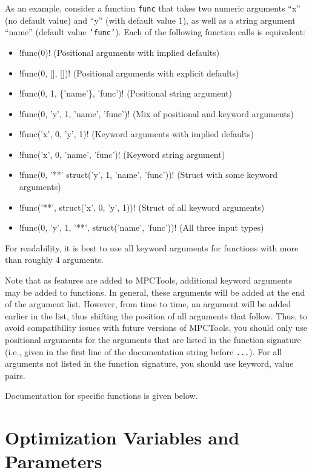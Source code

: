 \documentclass{article}
\newcommand{\mpctools}{MPCTools}
\providecommand{\lstinline}{}
\begin{document}
As an example, consider a function \texttt{func} that takes two numeric arguments ``x'' (no default value) and ``y'' (with default value 1), as well as a string argument ``name'' (default value \texttt{'func'}).
Each of the following function calls is equivalent:
%
\begin{itemize}
    \item \lstinline!func(0)! (Positional arguments with implied defaults)
    \item \lstinline!func(0, [], [])! (Positional arguments with explicit defaults)
    \item \lstinline!func(0, 1, \{'name'\}, 'func')! (Positional string argument)
    \item \lstinline!func(0, 'y', 1, 'name', 'func')! (Mix of positional and keyword arguments)
    \item \lstinline!func('x', 0, 'y', 1)! (Keyword arguments with implied defaults)
    \item \lstinline!func('x', 0, 'name', 'func')! (Keyword string argument)
    \item \lstinline!func(0, '**' struct('y', 1, 'name', 'func'))! (Struct with some keyword arguments)
    \item \lstinline!func('**', struct('x', 0, 'y', 1))! (Struct of all keyword arguments)
    \item \lstinline!func(0, 'y', 1, '**', struct('name', 'func'))! (All three input types)
\end{itemize}
%
For readability, it is best to use all keyword arguments for functions with more than roughly 4 arguments.

Note that as features are added to \mpctools{}, additional keyword arguments may be added to functions.
In general, these arguments will be added at the end of the argument list.
However, from time to time, an argument will be added earlier in the list, thus shifting the position of all arguments that follow.
Thus, to avoid compatibility issues with future versions of \mpctools{}, you should only use positional arguments for the arguments that are listed in the function signature
(i.e., given in the first line of the documentation string before \texttt{...}).
For all arguments not listed in the function signature, you should use keyword, value pairs.

Documentation for specific functions is given below.

\section{Optimization Variables and Parameters}
\end{document}
